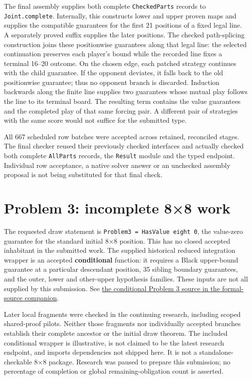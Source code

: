 \documentclass[10pt,a4paper]{article}
\newcommand{\code}[1]{\nolinkurl{#1}}
\begin{document}
The final assembly supplies both complete \code{CheckedParts} records to \code{Joint.complete}. Internally, this constructs lower and upper proven maps and supplies the compatible guarantees for the first 21 positions of a fixed legal line. A separately proved suffix supplies the later positions. The checked path-splicing construction joins these positionwise guarantees along that legal line: the selected continuation preserves each player's bound while the recorded line fixes a terminal 16–20 outcome. On the chosen edge, each patched strategy continues with the child guarantee. If the opponent deviates, it falls back to the old positionwise guarantee; thus no opponent branch is discarded. Induction backwards along the finite line supplies two guarantees whose mutual play follows the line to its terminal board. The resulting term contains the value guarantees and the completed play of that same forcing pair. A different pair of strategies with the same score would not suffice for the submitted type.

All 667 scheduled row batches were accepted across retained, reconciled stages. The final checker reused their previously checked interfaces and actually checked both complete \code{AllParts} records, the \code{Result} module and the typed endpoint. Individual row acceptance, a native solver answer or an unchecked assembly proposal is not being substituted for that final check.

\section{Problem 3: incomplete 8×8 work}

The requested draw statement is \code{Problem3 = HasValue eight 0}, the value-zero guarantee for the standard initial 8×8 position. This has no closed accepted inhabitant in the submitted work. The supplied historical reduced integration wrapper is an accepted \textbf{conditional} function: it requires a Black upper-bound guarantee at a particular descendant position, 35 sibling boundary guarantees, and the outer, lower and other-upper hypothesis families. These inputs are not all supplied by this submission. See \href{formal-source.html\#p3-conditional}{the conditional Problem 3 source in the formal-source companion}.

Later local fragments were checked in the continuing research, including scoped shared-proof pilots. Neither those fragments nor individually accepted branches establish their complete ancestor or the initial draw theorem. The included conditional wrapper is illustrative, is not claimed to be the latest research endpoint, and imports dependencies not shipped here. It is not a standalone-checkable 8×8 package. Research was paused to prepare this submission; no percentage of completion or global remaining-obligation count is asserted.
\end{document}
